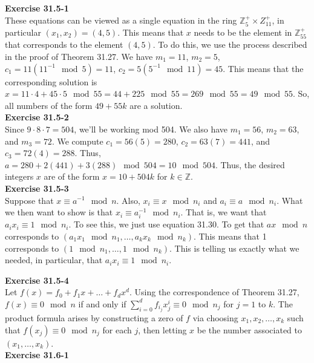 \documentclass{article}
\newcommand{\Z}{\mathbb{Z}}
\begin{document}
\noindent\textbf{Exercise 31.5-1}\\

These equations can be viewed as a single equation in the ring $\Z_5^+ \times Z_11^+$, in particular $(x_1,x_2) = (4,5)$. This means that $x$ needs to be the element in $\Z_55^+$ that corresponds to the element $(4,5)$. To do this, we use the process described in the proof of Theorem 31.27. We have $m_1 = 11$, $m_2 = 5$, $c_1 = 11(11^{-1} \mod 5) = 11 $, $c_2 = 5(5^{-1} \mod 11) = 45$. This means that the corresponding solution is $x = 11\cdot4 + 45\cdot 5 \mod 55 = 44 + 225 \mod 55= 269 \mod 55 = 49\mod 55$. So, all numbers of the form $49 + 55k$ are a solution.\\ 

\noindent\textbf{Exercise 31.5-2}\\

Since $9\cdot8\cdot7 = 504$, we'll be working mod 504. We also have $m_1 = 56$, $m_2 = 63$, and $m_3 = 72$.  We compute $c_1 = 56(5) = 280$, $c_2 = 63(7) = 441$, and $c_3 = 72(4) = 288$. Thus, $a = 280 + 2(441) + 3(288) \mod 504 = 10 \mod 504$. Thus, the desired integers $x$ are of the form $x = 10 + 504k$ for $k \in \mathbb{Z}$. \\

\noindent\textbf{Exercise 31.5-3}\\

Suppose that $x \equiv a^{-1} \mod n$. Also, $x_i \equiv  x\mod n_i$ and $a_i \equiv a \mod n_i$. What we then want to show is that $x_i \equiv a_i^{-1} \mod n_i$. That is, we want that $a_ix_i \equiv 1 \mod n_i$. To see this, we just use equation 31.30. To get that $ax\mod n$ corresponds to $(a_1x_1 \mod n_1, \ldots, a_kx_k \mod n_k)$. This means that 1 corresponds to $( 1\mod n_1, \ldots, 1\mod n_k)$. This is telling us exactly what we needed, in particular, that $a_i x_i \equiv 1 \mod n_i$.

\noindent\textbf{Exercise 31.5-4}\\

Let $f(x) = f_0 + f_1x + \ldots + f_dx^d$.  Using the correspondence of Theorem 31.27, $f(x) \equiv 0 \mod n$ if and only if $\sum_{i=0}^df_{i_j}x_j^i \equiv 0 \mod n_j$ for $j=1$ to $k$. The product formula arises by constructing a zero of $f$ via choosing $x_1, x_2, \ldots, x_k$ such that $f(x_j) \equiv 0 \mod n_j$ for each $j$, then letting $x$ be the number associated to $(x_1, \ldots, x_k)$. \\

\noindent\textbf{Exercise 31.6-1}\\
\end{document}
